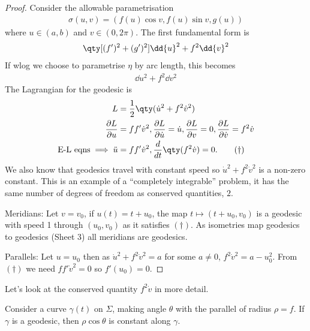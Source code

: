 \begin{proof}
	Consider the allowable parametrisation
	\begin{align*}
		\sigma(u,v) = (f(u) \cos v, f(u) \sin v, g(u))
	\end{align*}
	where $u \in (a,b)$ and $v \in (0,2\pi)$.
	The first fundamental form is
	\begin{align*}
		\qty[ (f')^2 + (g')^2 ] \dd{u}^2 + f^2 \dd{v}^2
	\end{align*}
	If wlog we choose to parametrise $\eta$ by arc length, this becomes
	\begin{align*}
		\dd{u}^2 + f^2 \dd{v}^2
	\end{align*}
	The Lagrangian for the geodesic is
	\begin{align*}
		L &= \frac{1}{2} \qty(\dot{u}^2 + f^2 \dot{v}^2) \\
		\frac{\partial L}{\partial u} &= f f' \dot{v}^2, \frac{\partial L}{\partial \dot{u}} = \dot{u}, \frac{\partial L}{\partial v} = 0, \frac{\partial L}{\partial \dot{v}} = f^2 \dot{v} \\
		\text{E-L eqns} \implies \ddot{u} &= f f' \dot{v}^2, \frac{d }{d t} \qty(f^2 \dot{v}) = 0. \tag{$\dagger$}
	\end{align*} 
	We also know that geodesics travel with constant speed so $\dot{u}^2 + f^2 \dot{v}^2$ is a non-zero constant.
	This is an example of a ``completely integrable'' problem, it has the same number of degrees of freedom as conserved quantities, $2$.

	Meridians: Let $v = v_0$, if $u(t) = t + u_0$, the map $t \mapsto (t + u_0, v_0)$ is a geodesic with speed 1 through $(u_0, v_0)$ as it satisfies $(\dagger)$.
	As isometries map geodesics to geodesics (Sheet 3) all meridians are geodesics.

	Parallels: Let $u = u_0$ then as $\dot{u}^2 + f^2 \dot{v}^2 = a$ for some $a \neq 0$, $f^2 \dot{v}^2 = a - u_0^2$. 
	From $(\dagger)$ we need $f f' \dot{v}^2 = 0$ so $f'(u_0) = 0$.
\end{proof}

Let's look at the conserved quantity $f^2 \dot{v}$ in more detail.

\begin{proposition}
	Consider a curve $\gamma(t)$ on $\Sigma$, making angle $\theta$ with the parallel of radius $\rho = f$.
	If $\gamma$ is a geodesic, then $\rho \cos \theta$ is constant along $\gamma$.
\end{proposition}


